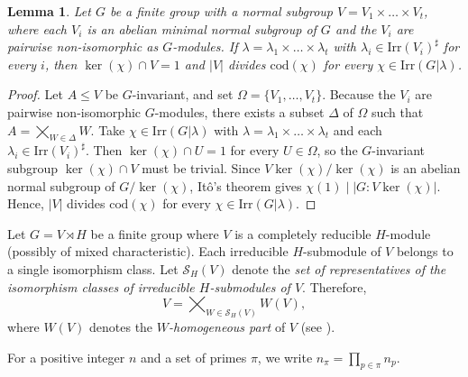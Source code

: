 \documentclass[9pt]{article}
\newtheorem{lem}{\bf Lemma}[section]
\begin{document}
\begin{lem}\label{lem: kernel, abelian, cod}
  Let $G$ be a finite group with a normal subgroup
$V = V_{1} \times \dots \times V_{t}$,
where each $V_{i}$ is an abelian minimal normal subgroup of $G$ and
the $V_{i}$ are pairwise non-isomorphic as $G$-modules.
If $\lambda = \lambda_{1} \times \dots \times \lambda_{t}$ with
$\lambda_{i} \in \mathrm{Irr}(V_{i})^{\sharp}$ for every $i$, then
$\ker(\chi) \cap V = 1$ and $|V|$ divides $\mathrm{cod}(\chi)$ for every
$\chi \in \mathrm{Irr}(G | \lambda)$.
\end{lem}
\begin{proof}
Let $A\le V$ be $G$-invariant, and set $\Omega=\{V_1,\dots,V_t\}$.  
Because the $V_i$ are pairwise non-isomorphic $G$-modules, there exists a subset $\Delta$ of $\Omega$ such that $A=\bigtimes_{W\in\Delta}W$.  
Take $\chi\in\mathrm{Irr}(G|\lambda)$ with $\lambda=\lambda_1\times\dots\times\lambda_t$ and each $\lambda_i\in\mathrm{Irr}(V_i)^\sharp$.  
Then $\ker(\chi)\cap U=1$ for every $U\in\Omega$, so the $G$-invariant subgroup $\ker(\chi)\cap V$ must be trivial.  
Since $V\ker(\chi)/\ker(\chi)$ is an abelian normal subgroup of $G/\ker(\chi)$, It\^o's theorem \cite[Theorem 6.15]{isaacs1994} gives $\chi(1)\mid|G:V\ker(\chi)|$.  
Hence, $|V|$ divides $\mathrm{cod}(\chi)$ for every $\chi\in\mathrm{Irr}(G|\lambda)$.
\end{proof}





Let $G=V \rtimes H$ be a finite group where $V$ is a completely reducible $H$-module (possibly of mixed characteristic).
Each irreducible $H$-submodule of $V$ belongs to a single isomorphism class.
Let $\mathcal{S}_H(V)$ denote the \emph{set of representatives of the isomorphism classes of irreducible $H$-submodules of $V$}.
Therefore, 
$$V=\bigtimes_{W\in \mathcal{S}_H(V)} W(V),$$
where $W(V)$ denotes the \emph{$W$-homogeneous part} of $V$ (see \cite[Definition 1.12]{isaacs1994}).








For a positive integer $n$ and a set of primes $\pi$, we write $n_{\pi} = \prod_{p \in \pi} n_{p}$.
\end{document}
